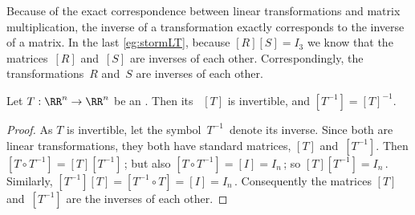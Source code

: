 Because of the exact correspondence between linear transformations and matrix multiplication, the inverse of a transformation exactly corresponds to the inverse of a matrix.
In the last \autoref{eg:stormLT}, because \([R][S]=I_3\) we know that the matrices~\([R]\) and~\([S]\) are inverses of each other. 
Correspondingly, the transformations~\(R\) and~\(S\) are inverses of each other.




\begin{theorem} \label{thm:invsm} 
Let \(T:\RR^n\to\RR^n\) be an  . 
Then its ~\([T]\) is invertible, and \([T^{-1}]=[T]^{-1}\). 
\end{theorem}
\begin{proof} 
As \(T\) is invertible,  let the symbol~\(T^{-1}\)~denote its inverse.
Since both are linear transformations, they both have standard matrices, \([T]\) and~\([T^{-1}]\).
Then \([T\circ T^{-1}]=[T][T^{-1}]\)\,; but also \([T\circ T^{-1}]=[I]=I_n\)\,; so \([T][T^{-1}]=I_n\)\,.
Similarly, \([T^{-1}][T]=[T^{-1}\circ T]=[I]=I_n\)\,.
Consequently the matrices \([T]\) and~\([T^{-1}]\) are the inverses of each other.
\end{proof}


